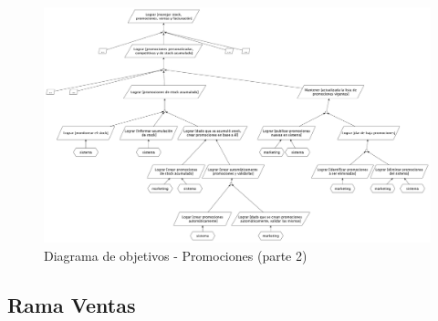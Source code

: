 \clearpage


\begin{figure}[h!]
  \centering
  \includegraphics[width=1.3\textwidth, angle=90]{./imagenes/promociones_2.pdf}
  \caption{Diagrama de objetivos - Promociones (parte 2)}
  \label{fig:diagProm2}
\end{figure}

\clearpage

\subsection{Rama Ventas}

